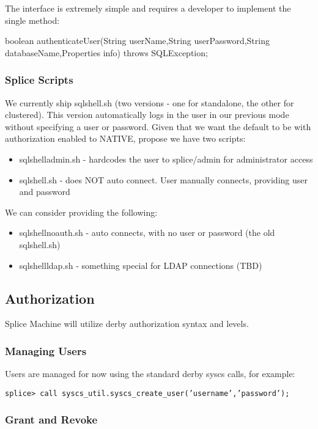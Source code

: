 \documentclass{article}
\begin{document}
The interface is extremely simple and requires a developer to implement the
single method:

boolean	authenticateUser(String userName,String userPassword,String
databaseName,Properties info) throws SQLException;

\subsubsection{Splice Scripts}

We currently ship sqlshell.sh (two versions - one for standalone, the other for clustered).  This version automatically 
logs in the user in our previous mode without specifying a user or password.  Given that we want the default to be with
authorization enabled to NATIVE, propose we have two scripts:

\begin{itemize}
\item sqlshelladmin.sh - hardcodes the user to splice/admin for administrator access
\item sqlshell.sh - does NOT auto connect.  User manually connects, providing user and password
\end{itemize}

We can consider providing the following: 

\begin{itemize}
\item sqlshellnoauth.sh - auto connects, with no user or password (the old sqlshell.sh)
\item sqlshellldap.sh - something special for LDAP connections (TBD)
\end{itemize}


\subsection{Authorization}
Splice Machine will utilize derby authorization syntax and levels. 

\subsubsection{Managing Users}
Users are managed for now using the standard derby syscs calls, for example:

\texttt{splice> call syscs\_util.syscs\_create\_user('username','password');}

\subsubsection{Grant and Revoke}
\end{document}
